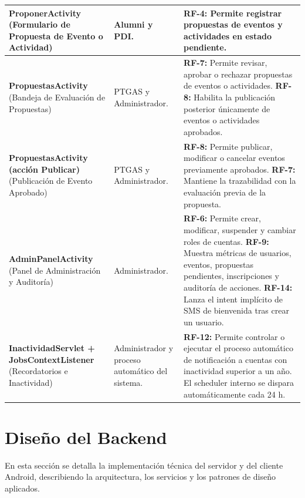 \documentclass{report}
\begin{document}
\begin{center}
\begin{longtable}{|p{}|p{}|p{}|}
\hline
\textbf{ProponerActivity} (Formulario de Propuesta de Evento o Actividad) &
Alumni y PDI. &
\textbf{RF-4:} Permite registrar propuestas de eventos y actividades en estado pendiente. \\
\hline
\textbf{PropuestasActivity} (Bandeja de Evaluación de Propuestas) &
PTGAS y Administrador. &
\textbf{RF-7:} Permite revisar, aprobar o rechazar propuestas de eventos o actividades.
\newline
\textbf{RF-8:} Habilita la publicación posterior únicamente de eventos o actividades aprobados. \\
\hline
\textbf{PropuestasActivity (acción Publicar)} (Publicación de Evento Aprobado) &
PTGAS y Administrador. &
\textbf{RF-8:} Permite publicar, modificar o cancelar eventos previamente aprobados.
\newline
\textbf{RF-7:} Mantiene la trazabilidad con la evaluación previa de la propuesta. \\
\hline
\textbf{AdminPanelActivity} (Panel de Administración y Auditoría) &
Administrador. &
\textbf{RF-6:} Permite crear, modificar, suspender y cambiar roles de cuentas.
\newline
\textbf{RF-9:} Muestra métricas de usuarios, eventos, propuestas pendientes, inscripciones y auditoría de acciones.
\newline
\textbf{RF-14:} Lanza el intent implícito de SMS de bienvenida tras crear un usuario. \\
\hline
\textbf{InactividadServlet + JobsContextListener} (Recordatorios e Inactividad) &
Administrador y proceso automático del sistema. &
\textbf{RF-12:} Permite controlar o ejecutar el proceso automático de notificación a cuentas con inactividad superior a un año. El scheduler interno se dispara automáticamente cada 24 h. \\
\hline
\end{longtable}
\end{center}

\section{Diseño del Backend}
En esta sección se detalla la implementación técnica del servidor y del cliente Android, describiendo la arquitectura, los servicios y los patrones de diseño aplicados.
\end{document}
